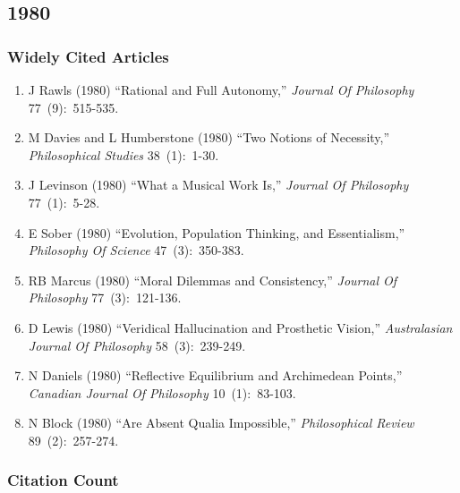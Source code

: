 \documentclass[
  10pt,
  letterpaper,
  DIV=11,
  numbers=noendperiod,
  twoside]{scrartcl}
\providecommand{\tightlist}{%
  \setlength{\itemsep}{0pt}\setlength{\parskip}{0pt}}\usepackage{longtable,booktabs,array}
\begin{document}
\newpage

\subsection{1980}\label{sec-s1980}

\subsubsection*{Widely Cited Articles}\label{widely-cited-articles-24}

\begin{enumerate}
\def\labelenumi{\arabic{enumi}.}
\tightlist
\item
  J Rawls (1980) ``Rational and Full Autonomy,'' \emph{Journal Of
  Philosophy} 77~(9):~515-535.
\item
  M Davies and L Humberstone (1980) ``Two Notions of Necessity,''
  \emph{Philosophical Studies} 38~(1):~1-30.
\item
  J Levinson (1980) ``What a Musical Work Is,'' \emph{Journal Of
  Philosophy} 77~(1):~5-28.
\item
  E Sober (1980) ``Evolution, Population Thinking, and Essentialism,''
  \emph{Philosophy Of Science} 47~(3):~350-383.
\item
  RB Marcus (1980) ``Moral Dilemmas and Consistency,'' \emph{Journal Of
  Philosophy} 77~(3):~121-136.
\item
  D Lewis (1980) ``Veridical Hallucination and Prosthetic Vision,''
  \emph{Australasian Journal Of Philosophy} 58~(3):~239-249.
\item
  N Daniels (1980) ``Reflective Equilibrium and Archimedean Points,''
  \emph{Canadian Journal Of Philosophy} 10~(1):~83-103.
\item
  N Block (1980) ``Are Absent Qualia Impossible,'' \emph{Philosophical
  Review} 89~(2):~257-274.
\end{enumerate}

\subsubsection*{Citation Count}\label{sec-count-1980}
\end{document}
